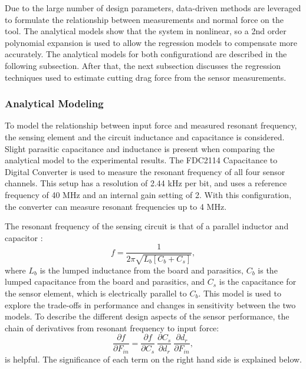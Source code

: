 Due to the large number of design parameters,
 data-driven methods are leveraged to formulate
the relationship between measurements and normal force on the tool.
The analytical models show that the system in nonlinear, so a 2nd order polynomial
expansion is used to allow the regression models to compensate more accurately.
The analytical models for both configurationd are described in the following subsection.
After that, the next subsection discusses the regression techniques used 
to estimate cutting drag force from the sensor measurements.

\subsubsection{Analytical Modeling}
To model the relationship between input force and measured resonant frequency, 
the sensing element and the circuit inductance and capacitance is considered.
Slight parasitic capacitance and inductance is present
when comparing the analytical model to the experimental results. 
The FDC2114 Capacitance to Digital Converter
is used to measure the resonant frequency of all four sensor channels.
This setup has a resolution of 2.44 kHz per bit, and uses
a reference frequency of 40 MHz and an internal gain setting of 2.
With this configuration, the converter can measure resonant frequencies up to 4 MHz.

The resonant frequency of the sensing circuit is that of a parallel inductor and capacitor \cite{Nilsson2015}:
\begin{equation}
f = \frac{1}{2\pi\sqrt{L_b [C_b + C_s]}},
\end{equation}
where $L_b$ is the lumped inductance from the board and parasitics, 
$C_b$ is the lumped capacitance from the board and parasitics,
and $C_s$ is the capacitance for the sensor element, which is electrically parallel to $C_b$.
This model is used to explore the trade-offs in performance and 
changes in sensitivity between the two models.
To describe the different design aspects of the sensor performance, 
the chain of derivatives from resonant frequency to input force:
\begin{equation}
\label{eq:rhs1}
\frac{\partial f}{\partial F_{in}} = \frac{\partial f}{\partial C_s} \ \frac{\partial C_s}{\partial d_r} \ \frac{\partial d_r}{\partial F_{in}},
\end{equation}
is helpful. 
The significance of each term on the right hand side is explained below.

